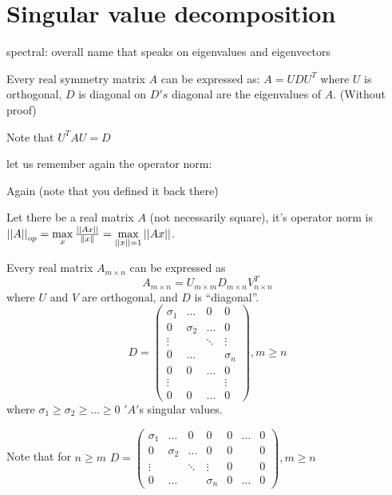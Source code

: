 \section{Singular value decomposition}

\begin{insight}
spectral: overall name that speaks on eigenvalues and eigenvectors%
\end{insight}

\begin{thm}
 Every real symmetry matrix $A$ can be expressed as: $A=UDU^{T}$
where $U$ is orthogonal, $D$ is diagonal on $D's$ diagonal are
the eigenvalues of $A$. (Without proof) %
\begin{insight}
Note that $U^{T}AU=D$%
\end{insight}
\end{thm}

let us remember again the operator norm:
\begin{definition}
\begin{insight}
Again (note that you defined it back there\.{)}%
\end{insight}
{} Let there be a real matrix $A$ (not necessarily square), it's operator
norm is $\left|\left|A\right|\right|_{op}=\max\limits _{x}\frac{\left|\left|Ax\right|\right|}{\left\Vert x\right\Vert}=\max\limits _{\left|\left|x\right|\right|=1}\left|\left|Ax\right|\right|$.
\end{definition}

\begin{thm}\label{theorem:SVD}
 Every real matrix $A_{m\times n}$ can be expressed as 
\[
A_{m\times n}=U_{m\times m}D_{m\times n}V_{n\times n}^{T}
\]
 where $U$ and $V$ are orthogonal, and $D$ is ``diagonal''. 
\[
D=\left(\begin{matrix}\sigma_{1} & \dots & 0 & 0\\
0 & \sigma_{2} & \dots & 0\\
\vdots &  & \ddots & \vdots\\
0 & \dots &  & \sigma_{n}\\
0 & 0 & \dots & 0\\
\vdots &  &  & \vdots\\
0 & 0 & \dots & 0
\end{matrix}\right),m\ge n
\]
where $\sigma_{1}\ge\sigma_{2}\ge\dots\ge0$ $'A'$s singular values.
\end{thm}

Note that for $n\ge m$ $D=\left(\begin{matrix}\sigma_{1} & \dots & 0 & 0 & 0 & \dots & 0\\
0 & \sigma_{2} & \dots & 0 & 0 &  & 0\\
\vdots &  & \ddots & \vdots & 0 &  & 0\\
0 & \dots &  & \sigma_{n} & 0 & \dots & 0
\end{matrix}\right),m\ge n$

